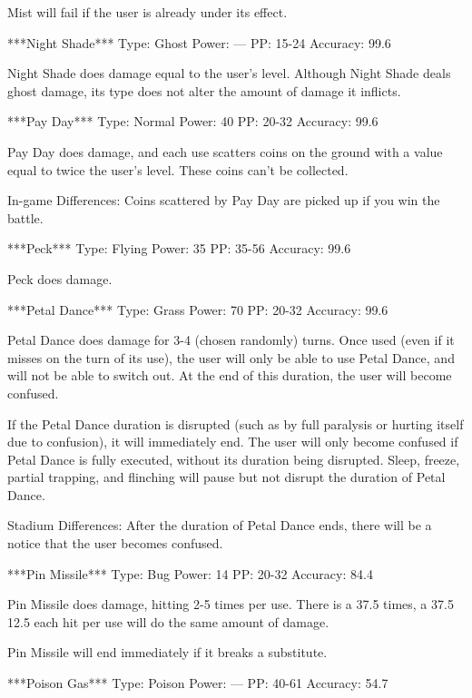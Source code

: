 \documentclass[reprint, aps, prl, paper=A4]{revtex4-1}
\begin{document}
Mist will fail if the user is already under its effect.


***Night Shade***
Type: Ghost
Power: ---
PP: 15-24
Accuracy: 99.6%

Night Shade does damage equal to the user's level. Although Night Shade deals ghost damage, its
type does not alter the amount of damage it inflicts.


***Pay Day***
Type: Normal
Power: 40
PP: 20-32
Accuracy: 99.6%

Pay Day does damage, and each use scatters coins on the ground with a value equal to twice the
user's level. These coins can't be collected.

In-game Differences:
Coins scattered by Pay Day are picked up if you win the battle.


***Peck***
Type: Flying
Power: 35
PP: 35-56
Accuracy: 99.6%

Peck does damage.


***Petal Dance***
Type: Grass
Power: 70
PP: 20-32
Accuracy: 99.6%

Petal Dance does damage for 3-4 (chosen randomly) turns. Once used (even if it misses on the
turn of its use), the user will only be able to use Petal Dance, and will not be able to switch
out. At the end of this duration, the user will become confused.

If the Petal Dance duration is disrupted (such as by full paralysis or hurting itself due to
confusion), it will immediately end. The user will only become confused if Petal Dance is fully
executed, without its duration being disrupted. Sleep, freeze, partial trapping, and flinching
will pause but not disrupt the duration of Petal Dance.

Stadium Differences:
After the duration of Petal Dance ends, there will be a notice that the user becomes confused.


***Pin Missile***
Type: Bug
Power: 14
PP: 20-32
Accuracy: 84.4%

Pin Missile does damage, hitting 2-5 times per use. There is a 37.5%
times, a 37.5%
12.5%
each hit per use will do the same amount of damage.

Pin Missile will end immediately if it breaks a substitute.


***Poison Gas***
Type: Poison
Power: ---
PP: 40-61
Accuracy: 54.7%
\end{document}
